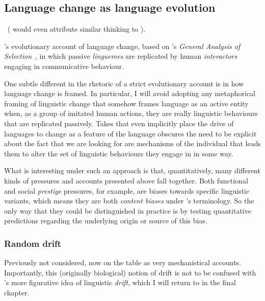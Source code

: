 

\subsection{Language change as language evolution}\label{sec:evolutionaryapproaches}

~(\citealt{Weinreich1968} would even attribute similar thinking to \citealt{Paul1920}).

\citet{Croft2000}'s evolutionary account of language change, based on \citeauthor{Hull1988}'s \emph{General Analysis of Selection}~\citeyearpar{Hull1988}, in which passive \emph{linguemes} are replicated by human \emph{interactors} engaging in communicative behaviour.

One subtle different in the rhetoric of a strict evolutionary account is in how language change is framed. In particular, I will avoid adopting any metaphorical framing of linguistic change that somehow frames language as an active entity when, as a group of imitated human actions, they are really linguistic behaviours that are replicated passively.
Takes that even implicitly place the drive of languages to change as a feature of the language obscures the need to be explicit about the fact that we are looking for are mechanisms of the individual that leads them to alter the set of linguistic behaviours they engage in in some way.

What is interesting under such an approach is that, quantitatively, many different kinds of pressures and accounts presented above fall together. Both functional and social \emph{prestige} pressures, for example, are biases towards specific linguistic variants, which means they are both \emph{content biases} under \citeauthor{Boyd1985}'s terminology. So the only way that they could be distinguished in practice is by testing quantitative predictions regarding the underlying origin or source of this bias.


\subsubsection{Random drift}



Previously not considered, now on the table as very mechanistical accounts. Importantly, this (originally biological) notion of drift is not to be confused with \citet{Sapir1921}'s more figurative idea of linguistic \emph{drift}, which I will return to in the final chapter.

